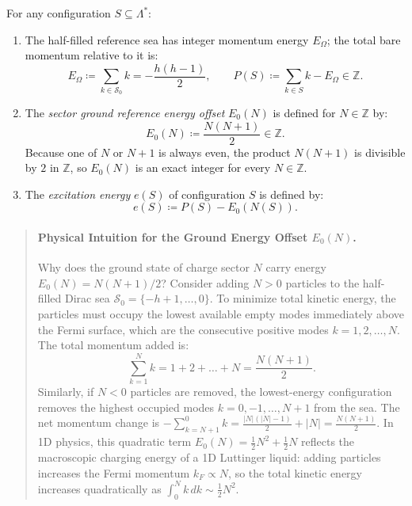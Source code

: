 \begin{definition}
For any configuration $S \subseteq \Lambda^*$:
\begin{enumerate}
    \item The half-filled reference sea has integer momentum energy $E_\Omega$; the total bare momentum relative to it is:
    \begin{equation}
    E_\Omega \coloneqq \sum_{k\in\mathcal{S}_0}k=-\frac{h(h-1)}2,\qquad
    P(S) \coloneqq \sum_{k\in S}k-E_\Omega\in\mathbb Z.
    \end{equation}
    \item The \emph{sector ground reference energy offset} $E_0(N)$ is defined for $N \in \mathbb{Z}$ by:
    \begin{equation}
    E_0(N) \coloneqq \frac{N(N+1)}{2} \in \mathbb{Z}.
    \end{equation}
    Because one of $N$ or $N+1$ is always even, the product $N(N+1)$ is divisible by $2$ in $\mathbb{Z}$, so $E_0(N)$ is an exact integer for every $N \in \mathbb{Z}$.
    \item The \emph{excitation energy} $e(S)$ of configuration $S$ is defined by:
    \begin{equation}
    e(S) \coloneqq P(S) - E_0(N(S)).
    \end{equation}
\end{enumerate}
\end{definition}

\begin{quote}
\item[]\paragraph{Physical Intuition for the Ground Energy Offset $E_0(N)$.}
Why does the ground state of charge sector $N$ carry energy $E_0(N) = N(N+1)/2$?
Consider adding $N > 0$ particles to the half-filled Dirac sea $\mathcal{S}_0 = \{-h+1, \dots, 0\}$. To minimize total kinetic energy, the particles must occupy the lowest available empty modes immediately above the Fermi surface, which are the consecutive positive modes $k = 1, 2, \dots, N$. The total momentum added is:
\begin{equation}
\sum_{k=1}^N k = 1 + 2 + \dots + N = \frac{N(N+1)}{2}.
\end{equation}
Similarly, if $N < 0$ particles are removed, the lowest-energy configuration removes the highest occupied modes $k = 0, -1, \dots, N+1$ from the sea. The net momentum change is $-\sum_{k=N+1}^0 k = \frac{|N|(|N|-1)}{2} + |N| = \frac{N(N+1)}{2}$.
In 1D physics, this quadratic term $E_0(N) = \frac{1}{2} N^2 + \frac{1}{2} N$ reflects the macroscopic charging energy of a 1D Luttinger liquid: adding particles increases the Fermi momentum $k_F \propto N$, so the total kinetic energy increases quadratically as $\int_0^N k \, dk \sim \frac{1}{2} N^2$.
\end{quote}


